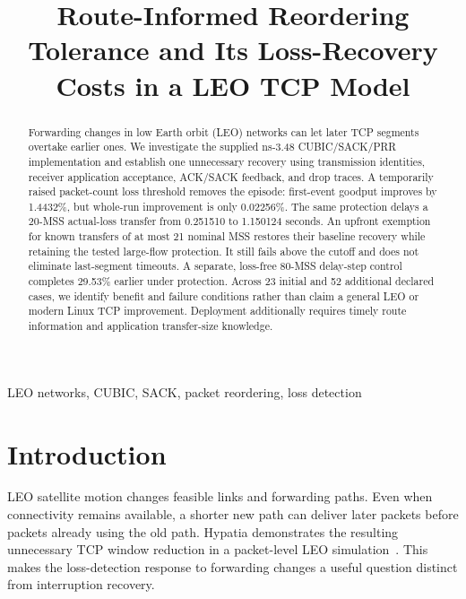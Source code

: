 \documentclass[conference]{IEEEtran}
\begin{document}
\title{Route-Informed Reordering Tolerance and Its Loss-Recovery Costs in a LEO TCP Model}
\author{
}
\maketitle

\begin{abstract}
Forwarding changes in low Earth orbit (LEO) networks can let later TCP
segments overtake earlier ones. We investigate the supplied ns-3.48
CUBIC/SACK/PRR implementation and establish one unnecessary recovery using
transmission identities, receiver application acceptance, ACK/SACK
feedback, and drop traces. A temporarily raised packet-count loss threshold
removes the episode: first-event goodput improves by 1.4432\%, but
whole-run improvement is only 0.02256\%. The same protection delays a
20-MSS actual-loss transfer from 0.251510 to 1.150124 seconds. An upfront
exemption for known transfers of at most 21 nominal MSS restores their
baseline recovery while retaining the tested large-flow protection.
It still fails above the cutoff and does not eliminate last-segment
timeouts. A separate, loss-free 80-MSS delay-step control completes 29.53\%
earlier under protection. Across 23 initial and 52 additional declared
cases, we identify benefit and failure conditions rather than claim a
general LEO or modern Linux TCP improvement. Deployment additionally
requires timely route information and application transfer-size knowledge.
\end{abstract}
\begin{IEEEkeywords}
LEO networks, CUBIC, SACK, packet reordering, loss detection
\end{IEEEkeywords}

\section{Introduction}
LEO satellite motion changes feasible links and forwarding paths.
Even when connectivity remains available, a shorter new path can deliver
later packets before packets already using the old path. Hypatia
demonstrates the resulting unnecessary TCP window reduction in a packet-level
LEO simulation~\cite{hypatia}. This makes the loss-detection response to
forwarding changes a useful question distinct from interruption recovery.
\end{document}

